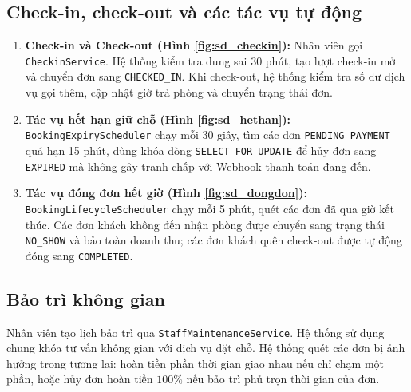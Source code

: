 
\subsection{Check-in, check-out và các tác vụ tự động}
\label{ssec:seq_vandanh}
\begin{enumerate}
    \item \textbf{Check-in và Check-out (Hình \ref{fig:sd_checkin}):} Nhân viên gọi \texttt{CheckinService}. Hệ thống kiểm tra dung sai 30 phút, tạo lượt check-in mở và chuyển đơn sang \texttt{CHECKED\_IN}. Khi check-out, hệ thống kiểm tra số dư dịch vụ gọi thêm, cập nhật giờ trả phòng và chuyển trạng thái đơn.
    \item \textbf{Tác vụ hết hạn giữ chỗ (Hình \ref{fig:sd_hethan}):} \texttt{BookingExpiryScheduler} chạy mỗi 30 giây, tìm các đơn \texttt{PENDING\_PAYMENT} quá hạn 15 phút, dùng khóa dòng \texttt{SELECT FOR UPDATE} để hủy đơn sang \texttt{EXPIRED} mà không gây tranh chấp với Webhook thanh toán đang đến.
    \item \textbf{Tác vụ đóng đơn hết giờ (Hình \ref{fig:sd_dongdon}):} \texttt{BookingLifecycleScheduler} chạy mỗi 5 phút, quét các đơn đã qua giờ kết thúc. Các đơn khách không đến nhận phòng được chuyển sang trạng thái \texttt{NO\_SHOW} và bảo toàn doanh thu; các đơn khách quên check-out được tự động đóng sang \texttt{COMPLETED}.
\end{enumerate}


\subsection{Bảo trì không gian}
\label{ssec:seq_baotri}
Nhân viên tạo lịch bảo trì qua \texttt{StaffMaintenanceService}. Hệ thống sử dụng chung khóa tư vấn không gian với dịch vụ đặt chỗ. Hệ thống quét các đơn bị ảnh hưởng trong tương lai: hoàn tiền phần thời gian giao nhau nếu chỉ chạm một phần, hoặc hủy đơn hoàn tiền $100\%$ nếu bảo trì phủ trọn thời gian của đơn.

